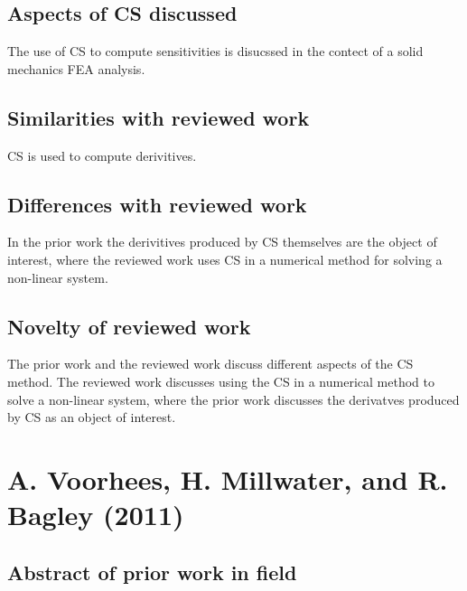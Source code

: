 \documentclass[10pt,letterpaper,draft]{article}
\begin{document}
\subsection{Aspects of CS discussed}
The use of CS to compute sensitivities is disucssed in the contect of a solid mechanics
FEA analysis.

\subsection{Similarities with reviewed work}
CS is used to compute derivitives.

\subsection{Differences with reviewed work}
In the prior work the derivitives produced by CS themselves are the object of interest, where
the reviewed work uses CS in a numerical method for solving a non-linear system.

\subsection{Novelty of reviewed work}
The prior work and the reviewed work discuss different aspects of the CS method. The
reviewed work discusses using the CS in a numerical method to solve a non-linear system,
where the prior work discusses the derivatves produced by CS as an object of interest.

\section{A. Voorhees, H. Millwater, and R. Bagley (2011)}
\subsection{Abstract of prior work in field}
\end{document}
